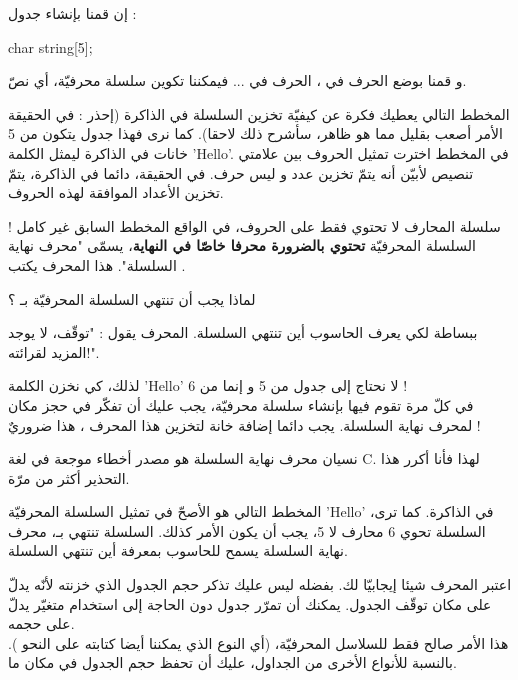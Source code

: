 إن قمنا بإنشاء جدول :
\begin{Csource}
char string[5];
\end{Csource}
و قمنا بوضع الحرف
في
،
الحرف
في
...
فيمكننا تكوين سلسلة محرفيّة، أي نصّ.

المخطط التالي يعطيك فكرة عن كيفيّة تخزين السلسلة في الذاكرة (إحذر : في الحقيقة الأمر أصعب بقليل مما هو ظاهر، سأشرح ذلك لاحقا).
كما نرى فهذا جدول يتكون من 5 خانات في الذاكرة ليمثل الكلمة
'\textenglish{Hello}'.
في المخطط اخترت تمثيل الحروف بين علامتي تنصيص  لأبيّن أنه يتمّ تخزين عدد و ليس حرف. في الحقيقة، دائما في الذاكرة، يتمّ تخزين الأعداد الموافقة لهذه الحروف.

سلسلة المحارف لا تحتوي فقط على الحروف، في الواقع المخطط السابق غير كامل !
السلسلة المحرفيّة
\textbf{تحتوي بالضرورة محرفا خاصّا في النهاية}،
يسمّى "محرف نهاية السلسلة". هذا المحرف يكتب
.
\begin{question}
  لماذا يجب أن تنتهي السلسلة المحرفيّة بـ ؟
\end{question}
ببساطة لكي يعرف الحاسوب أين تنتهي السلسلة. المحرف
يقول : "توقّف، لا يوجد المزيد لقرائته!".

لذلك، كي نخزن الكلمة
'\textenglish{Hello}'
 لا نحتاج إلى جدول من 5
و إنما من 6 !\\
في كلّ مرة تقوم فيها بإنشاء سلسلة محرفيّة، يجب عليك أن تفكّر في حجز مكان لمحرف نهاية السلسلة. يجب دائما إضافة خانة لتخزين هذا المحرف
،
هذا ضروريٌ !

نسيان محرف نهاية السلسلة
هو مصدر أخطاء موجعة في لغة
\textenglish{C}.
لهذا فأنا أكرر هذا التحذير أكثر من مرّة.

المخطط التالي هو الأصحّ في تمثيل السلسلة المحرفيّة
'\textenglish{Hello}'
في الذاكرة.
كما ترى، السلسلة تحوي 6 محارف لا 5، يجب أن يكون الأمر كذلك. السلسلة تنتهي بـ،
محرف نهاية السلسلة يسمح للحاسوب بمعرفة أين تنتهي السلسلة.

اعتبر المحرف
شيئا إيجابيّا لك. بفضله ليس عليك تذكر حجم الجدول الذي خزنته لأنّه يدلّ على مكان توقّف الجدول. يمكنك أن تمرّر جدول
دون الحاجة إلى استخدام متغيّر يدلّ على حجمه.\\
هذا الأمر صالح فقط للسلاسل المحرفيّة، (أي النوع
الذي يمكننا أيضا كتابته على النحو
).
بالنسبة للأنواع الأخرى من الجداول، عليك أن تحفظ حجم الجدول في مكان ما.

